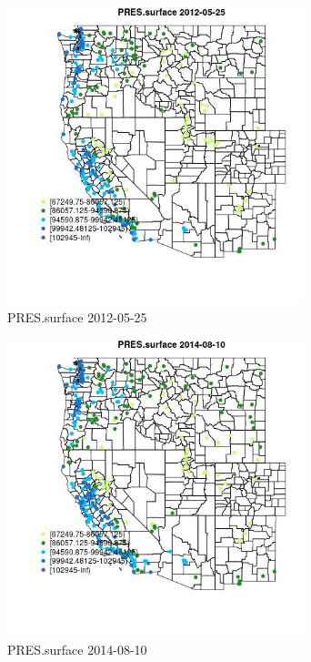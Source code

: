 \begin{figure} 
\centering  
\includegraphics[width=0.77\textwidth]{Code_Outputs/Report_ML_input_PM25_Step4_part_e_de_duplicated_aves_compiled_2019-05-18wNAs_MapObsPRESsurface2012-05-25.jpg} 
\caption{\label{fig:Report_ML_input_PM25_Step4_part_e_de_duplicated_aves_compiled_2019-05-18wNAsMapObsPRESsurface2012-05-25}PRES.surface 2012-05-25} 
\end{figure} 
 

\begin{figure} 
\centering  
\includegraphics[width=0.77\textwidth]{Code_Outputs/Report_ML_input_PM25_Step4_part_e_de_duplicated_aves_compiled_2019-05-18wNAs_MapObsPRESsurface2014-08-10.jpg} 
\caption{\label{fig:Report_ML_input_PM25_Step4_part_e_de_duplicated_aves_compiled_2019-05-18wNAsMapObsPRESsurface2014-08-10}PRES.surface 2014-08-10} 
\end{figure} 
 

